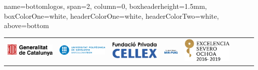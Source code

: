 \documentclass[a0paper,portrait]{baposter}
\begin{document}
\begin{poster}


\headerbox{}
{name=bottomlogos, span=2, column=0, boxheaderheight=1.5mm, boxColorOne=white, headerColorOne=white, headerColorTwo=white, above=bottom}{
\newlength{\logoheight}
\setlength{\logoheight}{8mm}
\begin{center}
\begin{tabular}{cccccccc}
\includegraphics[height=\logoheight]{Logos/GeneralitatDeCatalunya.png} & 
\includegraphics[height=\logoheight]{Logos/UPC.png} & 
\includegraphics[height=\logoheight]{Logos/Fundacio-CELLEX.png} & 
\includegraphics[height=\logoheight]{Logos/Fundacio-Mir-Puig.png} & 
\includegraphics[height=\logoheight]{Logos/Severo-Ochoa.png} & 

\end{tabular}
\end{center}}
\end{poster}
\end{document}
